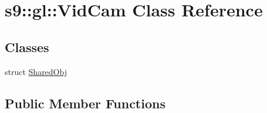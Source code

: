 \hypertarget{classs9_1_1gl_1_1VidCam}{\section{s9\-:\-:gl\-:\-:Vid\-Cam Class Reference}
\label{classs9_1_1gl_1_1VidCam}
}
\subsection*{Classes}
\begin{DoxyCompactItemize}
\item 
struct \hyperlink{structs9_1_1gl_1_1VidCam_1_1SharedObj}{Shared\-Obj}
\end{DoxyCompactItemize}
\subsection*{Public Member Functions}
